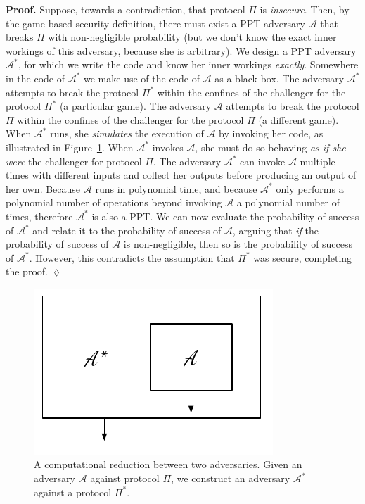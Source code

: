\noindent
\textbf{Proof. } Suppose, towards a contradiction, that protocol $\Pi$ is \emph{insecure}.
Then, by the game-based security definition, there must exist a PPT adversary $\mathcal{A}$
that breaks $\Pi$ with non-negligible probability (but we don't know the exact inner workings
of this adversary, because she is arbitrary).
We design a PPT adversary $\mathcal{A}^*$, for which we write the code
and know her inner workings \emph{exactly}. Somewhere in the code of $\mathcal{A}^*$ we make
use of the code of $\mathcal{A}$ as a black box. The adversary $\mathcal{A}^*$ attempts
to break the protocol $\Pi^*$ within the confines of the challenger for the protocol $\Pi^*$
(a particular game).
The adversary $\mathcal{A}$ attempts to break the protocol $\Pi$ within the confines of
the challenger for the protocol $\Pi$ (a different game).
When $\mathcal{A}^*$ runs, she \emph{simulates}
the execution of $\mathcal{A}$ by invoking her code, as illustrated in
Figure~\ref{fig.reduction}. When $\mathcal{A}^*$ invokes
$\mathcal{A}$, she must do so behaving \emph{as if she were} the challenger for protocol
$\Pi$. The adversary $\mathcal{A}^*$ can invoke $\mathcal{A}$ multiple times with
different inputs and collect her outputs before producing an output of her own.
Because $\mathcal{A}$ runs in polynomial time, and because $\mathcal{A}^*$ only
performs a polynomial number of operations beyond invoking $\mathcal{A}$ a polynomial
number of times, therefore $\mathcal{A}^*$ is also a PPT. We can now evaluate the
probability of success of $\mathcal{A}^*$ and relate it to the probability of success
of $\mathcal{A}$, arguing that \emph{if} the probability of success of $\mathcal{A}$
is non-negligible, then so is the probability of success of $\mathcal{A}^*$. However,
this contradicts the assumption that $\Pi^*$ was secure, completing the proof. $\lozenge$

\begin{figure}[h]
    \centering
    \includegraphics[width=0.4 \columnwidth,keepaspectratio]{figures/reduction.pdf}
    \caption{A computational reduction between two adversaries. Given an adversary
    $\mathcal{A}$ against protocol $\Pi$, we construct an adversary $\mathcal{A}^*$
    against a protocol $\Pi^*$.}
    \label{fig.reduction}
\end{figure}

